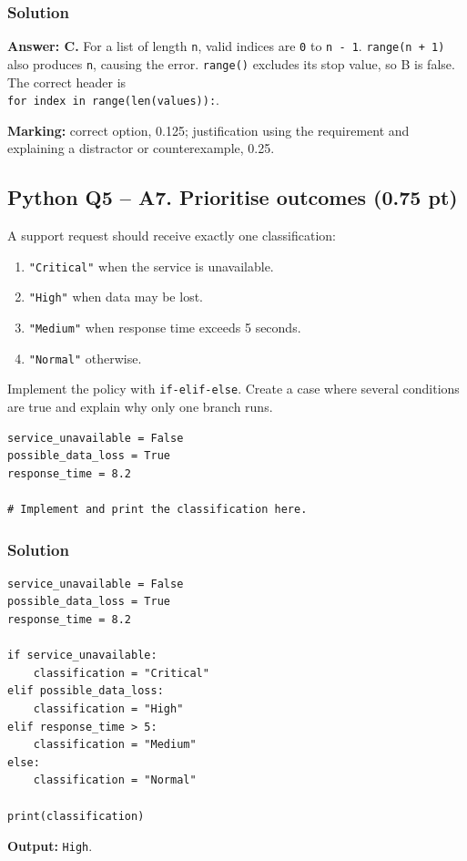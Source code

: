 \documentclass[10pt]{article}
\begin{document}
\subsubsection*{Solution}
\textbf{Answer: C.} For a list of length \texttt{n}, valid indices are
\texttt{0} to \texttt{n\ -\ 1}. \texttt{range(n\ +\ 1)} also produces
\texttt{n}, causing the error. \texttt{range()} excludes its stop value,
so B is false. The correct header is\\
\texttt{for\ index\ in\ range(len(values)):}.

\textbf{Marking:} correct option, 0.125; justification using the
requirement and explaining a distractor or counterexample, 0.25.

\clearpage
\subsection*{Python Q5 -- A7. Prioritise outcomes (0.75 pt)}
A support request should receive exactly one classification:
\begin{enumerate}
\item \texttt{"Critical"} when the service is unavailable.
\item \texttt{"High"} when data may be lost.
\item \texttt{"Medium"} when response time exceeds 5 seconds.
\item \texttt{"Normal"} otherwise.
\end{enumerate}
Implement the policy with \texttt{if-elif-else}. Create a case where several
conditions are true and explain why only one branch runs.

\begin{verbatim}
service_unavailable = False
possible_data_loss = True
response_time = 8.2

# Implement and print the classification here.
\end{verbatim}

\subsubsection*{Solution}
\begin{verbatim}
service_unavailable = False
possible_data_loss = True
response_time = 8.2

if service_unavailable:
    classification = "Critical"
elif possible_data_loss:
    classification = "High"
elif response_time > 5:
    classification = "Medium"
else:
    classification = "Normal"

print(classification)
\end{verbatim}
\textbf{Output:} \texttt{High}.
\end{document}
